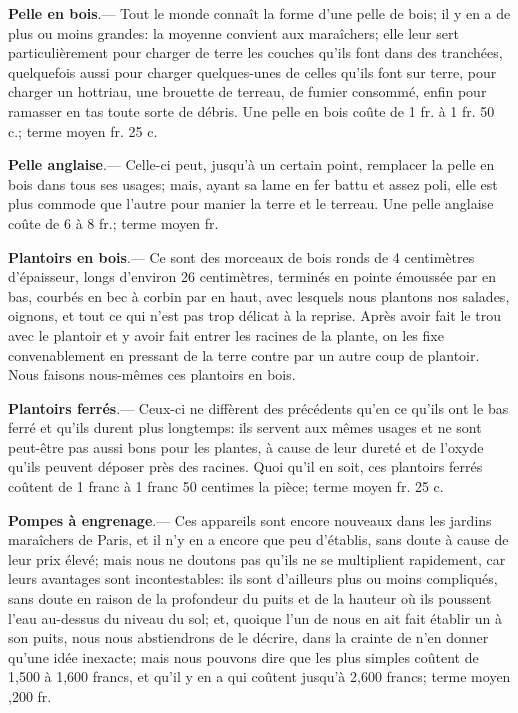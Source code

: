 \documentclass[10pt,a4paper]{book}
\begin{document}
\textbf{Pelle en bois}.--- Tout le monde connaît la forme d'une pelle de bois; il y en a de plus ou moins grandes: la moyenne convient aux maraîchers; elle leur sert particulièrement pour charger de terre les couches qu'ils font dans des tranchées, quelquefois aussi pour charger quelques-unes de celles qu'ils font sur terre, pour charger un hottriau, une brouette de terreau, de fumier consommé, enfin pour ramasser en tas toute sorte de débris. Une pelle en bois coûte de 1 fr. à 1 fr. 50 c.; terme moyen  fr. 25 c.

\textbf{Pelle anglaise}.--- Celle-ci peut, jusqu'à un certain point, remplacer la pelle en bois dans tous ses usages; mais, ayant sa lame en fer battu et assez poli, elle est plus commode que l'autre pour manier la terre et le terreau. Une pelle anglaise coûte de 6 à 8 fr.; terme moyen  fr.

\textbf{Plantoirs en bois}.--- Ce sont des morceaux de bois ronds de 4 centimètres d'épaisseur, longs d'environ 26 centimètres, terminés en pointe émoussée par en bas, courbés en bec à corbin par en haut, avec lesquels nous plantons nos salades, oignons, et tout ce qui n'est pas trop délicat à la reprise. Après avoir fait le trou avec le plantoir et y avoir fait entrer les racines de la plante, on les fixe convenablement en pressant de la terre contre par un autre coup de plantoir. Nous faisons nous-mêmes ces plantoirs en bois.

\textbf{Plantoirs ferrés}.--- Ceux-ci ne diffèrent des précédents qu'en ce qu'ils ont le bas ferré et qu'ils durent plus longtemps: ils servent aux mêmes usages et ne sont peut-être pas aussi bons pour les plantes, à cause de leur dureté et de l'oxyde qu'ils peuvent déposer près des racines. Quoi qu'il en soit, ces plantoirs ferrés coûtent de 1 franc à 1 franc 50 centimes la pièce; terme moyen  fr. 25 c.

\textbf{Pompes à engrenage}.--- Ces appareils sont encore nouveaux dans les jardins maraîchers de Paris, et il n'y en a encore que peu d'établis, sans doute à cause de leur prix élevé; mais nous ne doutons pas qu'ils ne se multiplient rapidement, car leurs avantages sont incontestables: ils sont d'ailleurs plus ou moins compliqués, sans doute en raison de la profondeur du puits et de la hauteur où ils poussent l'eau au-dessus du niveau du sol; et, quoique l'un de nous en ait fait établir un à son puits, nous nous abstiendrons de le décrire, dans la crainte de n'en donner qu'une idée inexacte; mais nous pouvons dire que les plus simples coûtent de 1,500 à 1,600 francs, et qu'il y en a qui coûtent jusqu'à 2,600 francs; terme moyen ,200 fr.
\end{document}
